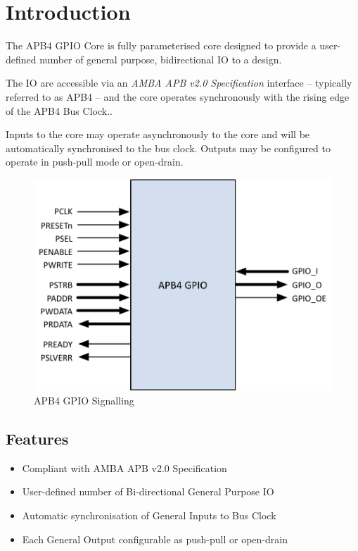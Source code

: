 \chapter{Introduction} \label{introduction}

The APB4 GPIO Core is fully parameterised core designed to provide a
user-defined number of general purpose, bidirectional IO to a design.

The IO are accessible via an \emph{AMBA APB v2.0 Specification}
interface -- typically referred to as APB4 -- and the core operates
synchronously with the rising edge of the APB4 Bus Clock..

Inputs to the core may operate asynchronously to the core and will be
automatically synchronised to the bus clock. Outputs may be configured
to operate in push-pull mode or open-drain.

\begin{figure}[tbh]
	\centering
	\includegraphics{assets/img/apb4-gpio-sig.png}
	\caption{APB4 GPIO Signalling}
	\label{fig:apb4-gpio-sig}
\end{figure}

\section{Features}\label{features}

\begin{itemize}
\item
  Compliant with AMBA APB v2.0 Specification
\item
  User-defined number of Bi-directional General Purpose IO
\item
  Automatic synchronisation of General Inputs to Bus Clock
\item
  Each General Output configurable as push-pull or open-drain
\end{itemize}